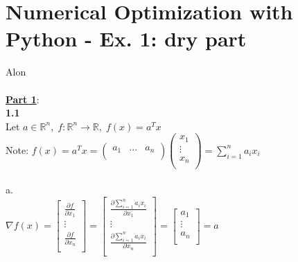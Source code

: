 \documentclass[fleqn]{article}
\begin{document}
\newcommand\tab[1][1cm]{\hspace*{#1}}
\section*{Numerical Optimization with Python -  Ex. 1: dry part}
Alon\\ \\



\underline{\textbf{Part 1}}:\\

\textbf{1.1} \\
Let $a \in \mathbb{R}^n, \; f:\mathbb{R}^n \rightarrow \mathbb{R}, \; f(x)=a^T x$ \\
Note: 
$f(x)=a^T x = \begin{pmatrix} a_1 & ... & a_n \\ \end{pmatrix}
\begin{pmatrix} x_1 \\ \vdots \\ x_n \\ \end{pmatrix} = 
 \sum_{i=1}^{n} a_i x_i 
$ \\ \\

a. \\
$
\nabla f(x) = \begin{bmatrix} \frac{\partial f}{\partial x_1} \\
				\vdots \\     \frac{\partial f}{\partial x_n} \\ \end{bmatrix} 
=
\begin{bmatrix} \frac{\partial \sum_{i=1}^{n} a_i x_i}{\partial x_1} \\
				\vdots \\     \frac{\partial \sum_{i=1}^{n} a_i x_i}{\partial x_n} \\ \end{bmatrix} 
=
\begin{bmatrix} a_1 \\ \vdots \\ a_n \\ \end{bmatrix} = a
$ \\ \\
\end{document}
